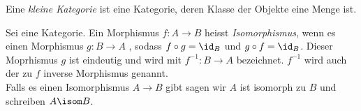 \documentclass{article}
\begin{document}
	Eine \emph{kleine Kategorie} ist eine Kategorie, deren Klasse der Objekte eine Menge ist.
	
	
	
	Sei \KatC eine Kategorie. Ein Morphismus \( f: A \to B  \) heisst  \emph{Isomorphismus}, wenn es einen Morphismus \( g: B \to A \) , sodass \( f \circ g  = \id_B \) und \( g \circ f = \id_B \). 
	Dieser Moprhismus \( g \) ist eindeutig und wird mit \( f^{-1} :B \to A \) bezeichnet.
	\(f^{-1} \) wird auch der zu \( f \)  inverse Morphismus genannt.\\
	Falls es einen Isomorphismus \(A \to B \) gibt sagen wir \( A \) ist isomorph zu \( B \) und schreiben \( A \isom B \).
	
	
				
	 
\end{document}
